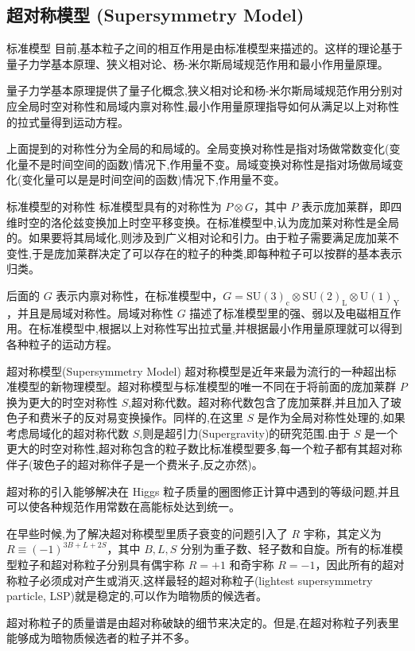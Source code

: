 \documentclass{beamer} %
\begin{document}
\subsection{超对称模型 (Supersymmetry Model)}

\begin{frame}{标准模型}
目前,基本粒子之间的相互作用是由标准模型来描述的。这样的理论基于量子力学基本原理、狭义相对论、杨-米尔斯局域规范作用和最小作用量原理。

量子力学基本原理提供了量子化概念,狭义相对论和杨-米尔斯局域规范作用分别对应全局时空对称性和局域内禀对称性,最小作用量原理指导如何从满足以上对称性的拉式量得到运动方程。

上面提到的对称性分为全局的和局域的。全局变换对称性是指对场做常数变化(变化量不是时间空间的函数)情况下,作用量不变。局域变换对称性是指对场做局域变化(变化量可以是是时间空间的函数)情况下,作用量不变。
\end{frame}

\begin{frame}{标准模型的对称性}
标准模型具有的对称性为 $P\otimes G$，其中 $P$ 表示庞加莱群，即四维时空的洛伦兹变换加上时空平移变换。在标准模型中,认为庞加莱对称性是全局的。如果要将其局域化,则涉及到广义相对论和引力。由于粒子需要满足庞加莱不变性,于是庞加莱群决定了可以存在的粒子的种类,即每种粒子可以按群的基本表示归类。

后面的 $G$ 表示内禀对称性，在标准模型中，$G=\mathrm{SU(3)_c \otimes SU(2)_L \otimes U(1)_Y }$，并且是局域对称性。局域对称性 $G$ 描述了标准模型里的强、弱以及电磁相互作用。在标准模型中,根据以上对称性写出拉式量,并根据最小作用量原理就可以得到各种粒子的运动方程。
\end{frame}

\begin{frame}{超对称模型(Supersymmetry Model)}
超对称模型是近年来最为流行的一种超出标准模型的新物理模型。超对称模型与标准模型的唯一不同在于将前面的庞加莱群 $P$ 换为更大的时空对称性 $S$,超对称代数。超对称代数包含了庞加莱群,并且加入了玻色子和费米子的反对易变换操作。同样的,在这里 $S$ 是作为全局对称性处理的,如果考虑局域化的超对称代数 $S$,则是超引力(Supergravity)的研究范围.由于 $S$ 是一个更大的时空对称性,超对称包含的粒子数比标准模型要多,每一个粒子都有其超对称伴子(玻色子的超对称伴子是一个费米子,反之亦然)。
\end{frame}

\begin{frame}
超对称的引入能够解决在 Higgs 粒子质量的圈图修正计算中遇到的等级问题,并且可以使各种规范作用常数在高能标处达到统一。

在早些时候,为了解决超对称模型里质子衰变的问题引入了 $R$ 宇称，其定义为 $R\equiv (-1)^{3B+L+2S}$，其中 $B,L,S$ 分别为重子数、轻子数和自旋。所有的标准模型粒子和超对称粒子分别具有偶宇称 $R=+1$ 和奇宇称 $R=-1$，因此所有的超对称粒子必须成对产生或消灭,这样最轻的超对称粒子(lightest supersymmetry particle, LSP)就是稳定的,可以作为暗物质的候选者。

超对称粒子的质量谱是由超对称破缺的细节来决定的。但是,在超对称粒子列表里能够成为暗物质候选者的粒子并不多。
\end{frame}
\end{document}
